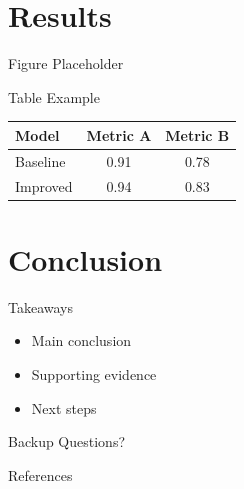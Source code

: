 \documentclass[aspectratio=169]{beamer}
\begin{document}
\section{Results}

\begin{frame}{Figure Placeholder}
  \begin{center}
  \end{center}
\end{frame}

\begin{frame}{Table Example}
  \begin{table}
    \centering
    \begin{tabular}{lcc}
      \toprule
      Model & Metric A & Metric B \\
      \midrule
      Baseline & 0.91 & 0.78 \\
      Improved & 0.94 & 0.83 \\
      \bottomrule
    \end{tabular}
  \end{table}
\end{frame}

\section{Conclusion}

\begin{frame}{Takeaways}
  \begin{itemize}
    \item Main conclusion
    \item Supporting evidence
    \item Next steps
  \end{itemize}
\end{frame}

\begin{frame}{Backup}
  \centering
  Questions?
\end{frame}

\begin{frame}[allowframebreaks]{References}
  
  
\end{frame}
\end{document}
